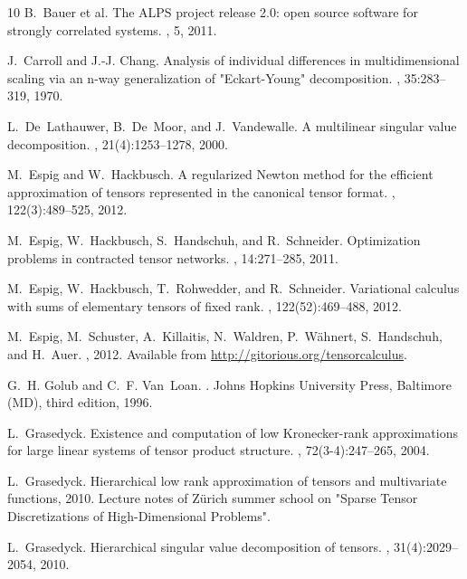 \documentclass[11pt, a4paper]{article}
\begin{document}
\begin{thebibliography}{10}
B.~{Bauer et al.}
\newblock The {ALPS} project release 2.0: open source software for strongly
  correlated systems.
, 5, 2011.

J.~Carroll and J.-J. Chang.
\newblock Analysis of individual differences in multidimensional scaling via an
  n-way generalization of {"Eckart-Young"} decomposition.
, 35:283--319, 1970.

L.~De~Lathauwer, B.~De~Moor, and J.~Vandewalle.
\newblock A multilinear singular value decomposition.
, 21(4):1253--1278, 2000.

M.~Espig and W.~Hackbusch.
\newblock A regularized {N}ewton method for the efficient approximation of
  tensors represented in the canonical tensor format.
, 122(3):489--525, 2012.

M.~Espig, W.~Hackbusch, S.~Handschuh, and R.~Schneider.
\newblock Optimization problems in contracted tensor networks.
, 14:271--285, 2011.

M.~Espig, W.~Hackbusch, T.~Rohwedder, and R.~Schneider.
\newblock Variational calculus with sums of elementary tensors of fixed rank.
, 122(52):469--488, 2012.

M.~Espig, M.~Schuster, A.~Killaitis, N.~Waldren, P.~W\"ahnert, S.~Handschuh,
  and H.~Auer.
, 2012.
\newblock Available from \url{http://gitorious.org/tensorcalculus}.

G.~H. Golub and C.~F. Van~Loan.
.
\newblock Johns Hopkins University Press, Baltimore (MD), third edition, 1996.

L.~Grasedyck.
\newblock Existence and computation of low {K}ronecker-rank approximations for
  large linear systems of tensor product structure.
, 72(3-4):247--265, 2004.

L.~Grasedyck.
\newblock Hierarchical low rank approximation of tensors and multivariate
  functions, 2010.
\newblock Lecture notes of Z\"urich summer school on "Sparse Tensor
  Discretizations of High-Dimensional Problems".

L.~Grasedyck.
\newblock Hierarchical singular value decomposition of tensors.
, 31(4):2029--2054, 2010.


\end{thebibliography}
\end{document}
